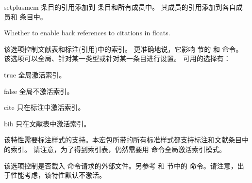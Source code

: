 \begin{optionlist}
\begin{valuelist}
\item[setplusmem] %
 条目的引用添加到   条目和所有成员中。
其成员的引用添加到各自成员和  条目中。

\end{valuelist}


Whether to enable back references to citations in floats.

该选项控制文献表和标注(引用)中的索引。
更准确地说，它影响  节的  和  命令。
该选项可以全局、针对某一类型或针对某一条目进行设置。
可用的选择有：

\begin{valuelist}
\item[true] %
全局激活索引。
\item[false] %
全局不激活索引。
\item[cite] %
只在标注中激活索引。
\item[bib] %
只在文献表中激活索引。
\end{valuelist}

该特性需要标注样式的支持。本宏包所带的所有标准样式都支持标注和文献条目中的索引。
请注意，为了得到索引表，仍然需要用  命令全局激活索引模式。


该选项控制是否载入  命令请求的外部文件。另参考  和  节中的  命令。请注意，出于性能考虑，该特性默认不激活。


\end{optionlist}
